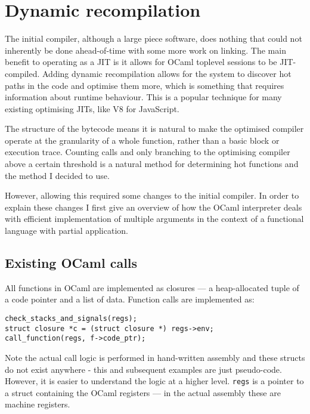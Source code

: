 \section{Dynamic recompilation} \label{dyn-recomp}

The initial compiler, although a large piece software, does nothing that could not inherently be
done ahead-of-time with some more work on linking. The main benefit to operating as a JIT is it
allows for OCaml toplevel sessions to be JIT-compiled. Adding dynamic recompilation allows for the
system to discover hot paths in the code and optimise them more, which is something that requires
information about runtime behaviour. This is a popular technique for many existing optimising JITs,
like V8 for JavaScript. \cite{v8}

The structure of the bytecode means it is natural to make the optimised compiler operate at the
granularity of a whole function, rather than a basic block or execution trace. Counting calls and
only branching to the optimising compiler above a certain threshold is a natural method for
determining hot functions and the method I decided to use.

However, allowing this required some changes to the initial compiler. In order to explain these
changes I first give an overview of how the OCaml interpreter deals with efficient
implementation of multiple arguments in the context of a functional language with partial
application.

\subsection{Existing OCaml calls} \label{exist-ocaml}

All functions in OCaml are implemented as closures --- a heap-allocated tuple of a code pointer and
a
list of data. Function calls are implemented as:

\begin{verbatim}
check_stacks_and_signals(regs);
struct closure *c = (struct closure *) regs->env;
call_function(regs, f->code_ptr);
\end{verbatim}

Note the actual call logic is performed in hand-written assembly and these structs do not exist
anywhere
- this and subsequent examples are just pseudo-code. However, it is easier to understand the logic
at a higher level. \texttt{regs} is a pointer to a struct containing the OCaml registers --- in the
actual assembly these are machine registers.


